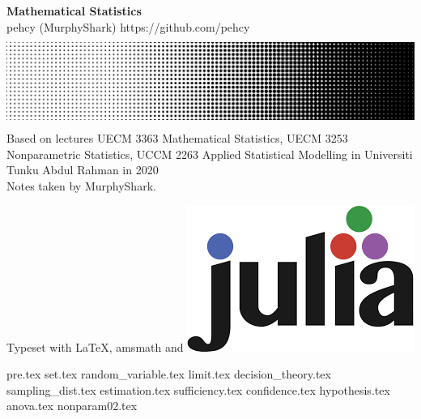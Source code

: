 \documentclass[11pt,twoside]{report}
\begin{document}
\begin{titlepage}
  \centering
  \vfill
  {\Large
      \textbf{Mathematical Statistics}\\
      \vskip2cm
      pehcy (MurphyShark) \quad \textsf{https://github.com/pehcy} \\
  }    
  \vfill
  \includegraphics[width=0.8\paperwidth, height=3cm]{./src/images/HalftoneGradient.png} %
  \vskip2cm
  {
    Based on lectures UECM 3363 Mathematical Statistics, UECM 3253 Nonparametric Statistics, UCCM 2263 Applied Statistical Modelling in Universiti Tunku Abdul Rahman in 2020\\
    Notes taken by MurphyShark.
  }
  \vfill
  \begin{flushleft}
    \footnotesize Typeset with \LaTeX, amsmath and \includegraphics[scale=0.06, height=3ex]{./src/images/Julia.png}
  \end{flushleft}
\end{titlepage}
{pre.tex}
{set.tex}
{random_variable.tex}
{limit.tex}
{decision_theory.tex}
{sampling_dist.tex}
{estimation.tex}
{sufficiency.tex}
{confidence.tex}
{hypothesis.tex}
{anova.tex}
{nonparam02.tex}
\end{document}
